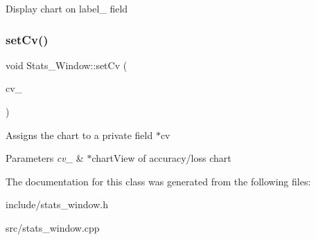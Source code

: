Display chart on label\+\_ field \mbox{\label{classStats__Window_aa08614ebaf747b305a39bb790d2a96bd}} 
\subsubsection{\texorpdfstring{set\+Cv()}{setCv()}}
{\footnotesize\ttfamily void Stats\+\_\+\+Window\+::set\+Cv (\begin{DoxyParamCaption}\item[{Q\+Chart\+View $\ast$}]{cv\+\_\+ }\end{DoxyParamCaption})}

Assigns the chart to a private field $\ast$cv 
\begin{DoxyParams}{Parameters}
{\em cv\+\_\+} & $\ast$chart\+View of accuracy/loss chart \\
\hline
\end{DoxyParams}


The documentation for this class was generated from the following files\+:\begin{DoxyCompactItemize}
\item 
include/stats\+\_\+window.\+h\item 
src/stats\+\_\+window.\+cpp\end{DoxyCompactItemize}

